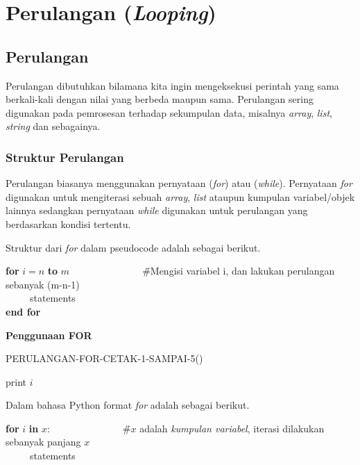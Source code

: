 \chapter{Perulangan (\textit{Looping})}

\section{Perulangan}
Perulangan dibutuhkan bilamana kita ingin mengeksekusi perintah yang sama berkali-kali dengan nilai yang berbeda maupun sama. Perulangan sering digunakan pada pemrosesan terhadap sekumpulan data, misalnya \textit{array}, \textit{list}, \textit{string} dan sebagainya.

\subsection{Struktur Perulangan}
Perulangan biasanya menggunakan pernyataan (\textit{for}) atau (\textit{while}). Pernyataan \textit{for} digunakan untuk mengiterasi sebuah \textit{array}, \textit{list} ataupun kumpulan variabel/objek lainnya sedangkan pernyataan \textit{while} digunakan untuk perulangan yang berdasarkan kondisi tertentu.

Struktur dari \textit{for} dalam pseudocode adalah sebagai berikut.
\begin{tabbing}
\textbf{for} $i=n$ \textbf{to} $m$~~~~~~~~~~~~~~~\=\#Mengisi variabel i, dan lakukan perulangan sebanyak (m-n-1)\\
~~~~~statements\\
\textbf{end for}
\end{tabbing}

\begin{contoh}
	\textbf{Penggunaan FOR}
	\begin{algorithm}
	\caption{PERULANGAN-FOR-CETAK-1-SAMPAI-5()}
		\begin{algorithmic}[1]
			\STATE print $i$
		\ENDFOR
		\STATE{}
		\STATE{}
		\end{algorithmic}
	\end{algorithm}
\end{contoh}

Dalam bahasa Python format \textit{for} adalah sebagai berikut.
\begin{tabbing}
\textbf{for} $i$ \textbf{in} $x$:~~~~~~~~~~~~~~~\=\#$x$ adalah \textit{kumpulan variabel}, iterasi dilakukan sebanyak panjang $x$\\
~~~~~statements\\
\end{tabbing}

